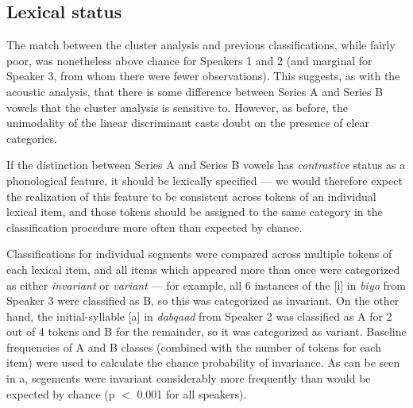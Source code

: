 \documentclass[output=paper
,newtxmath
,modfonts
,nonflat]{langsci/langscibook}
\begin{document}
\subsection{Lexical status}
\label{lex}

The match between the cluster analysis and previous classifications, while fairly poor, was nonetheless above chance for Speakers 1 and 2 (and marginal for Speaker 3, from whom there were fewer observations).  This suggests, as with the acoustic analysis, that there is some difference between Series A and Series B vowels that the cluster analysis is sensitive to.  However, as before, the unimodality of the linear discriminant casts doubt on the presence of clear categories.

If the distinction between Series A and Series B vowels has \textit{contrastive} status as a phonological feature, it should be lexically specified --- we would therefore expect the realization of this feature to be consistent across tokens of an individual lexical item, and those tokens should be assigned to the same category in the classification procedure more often than expected by chance.

Classifications for individual segments were compared across multiple tokens of each lexical item, and all items which appeared more than once were categorized as either \emph{invariant} or \emph{variant} --- for example, all 6 instances of the [i] in \emph{biyo} from Speaker 3 were classified as B, so this was categorized as invariant.  On the other hand, the initial-syllable [a] in \emph{dabqaad} from Speaker 2 was classified as A for 2 out of 4 tokens and B for the remainder, so it was categorized as variant.  Baseline frequencies of A and B classes (combined with the number of tokens for each item) were used to calculate the chance probability of invariance.  As can be seen in a, segements were invariant considerably more frequently than would  be expected by chance (p $<$ 0.001 for all speakers).
\end{document}
